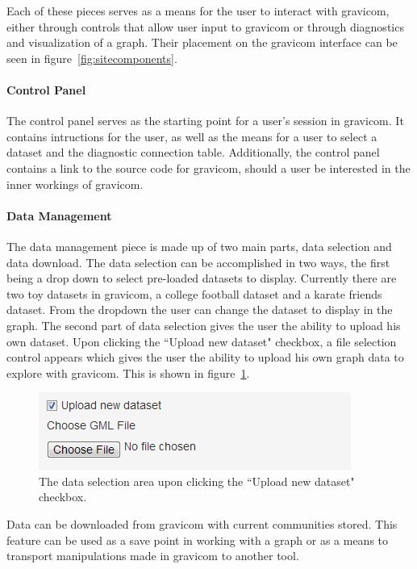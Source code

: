 \documentclass{article}
\begin{document}
Each of these pieces serves as a means for the user to interact with gravicom, either through controls that allow user input to gravicom or through diagnostics and visualization of a graph. Their placement on the gravicom interface can be seen in figure~\ref{fig:sitecomponents}.

\paragraph{Control Panel}
The control panel serves as the starting point for a user's session in gravicom. It contains intructions for the user, as well as the means for a user to select a dataset and the diagnostic connection table. Additionally, the control panel contains a link to the source code for gravicom, should a user be interested in the inner workings of gravicom.

\paragraph{Data Management}
The data management piece is made up of two main parts, data selection and data download. The data selection can be accomplished in two ways, the first being a drop down to select pre-loaded datasets to display. Currently there are two toy datasets in gravicom, a college football dataset and a karate friends dataset. From the dropdown the user can change the dataset to display in the graph. The second part of data selection gives the user the ability to upload his own dataset. Upon clicking the ``Upload new dataset" checkbox, a file selection control appears which gives the user the ability to upload his own graph data to explore with gravicom. This is shown in figure~\ref{fig:uploadnewdataset}. 

\begin{figure}[H]
\centering
\includegraphics[]{images/uploadnewdataset.png}
\caption{\label{fig:uploadnewdataset} The data selection area upon clicking the ``Upload new dataset" checkbox.}
\end{figure}

Data can be downloaded from gravicom with current communities stored. This feature can be used as a save point in working with a graph or as a means to transport manipulations made in gravicom to another tool.
\end{document}
